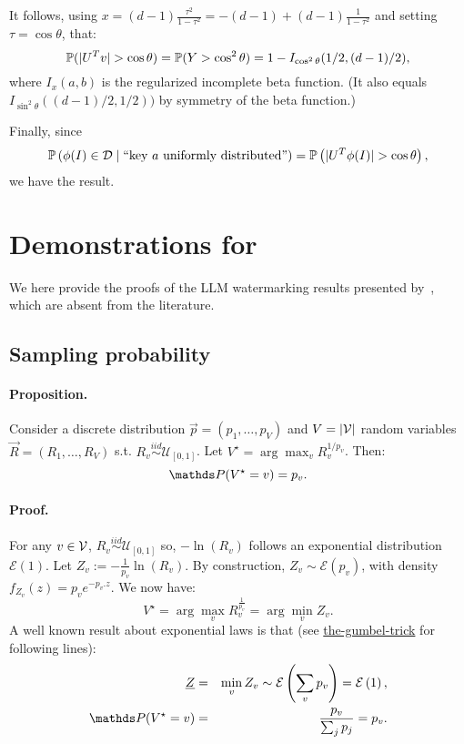 It follows, using $x=(d-1)\frac{\tau^2}{1-\tau^2} = -(d-1) + (d-1)\frac{1}{1-\tau^2}$ and setting $\tau = \cos\theta$, that:
$$\mathbb P (\lvert{U^T v}\rvert > \cos \theta) = \mathbb P (Y> \cos^2 \theta) = 1 - I_{\cos^2 \theta}(1/2, (d-1)/2),$$
where $I_x(a,b)$ is the regularized incomplete beta function.
(It also equals $ I_{\sin^2 \theta}( (d-1)/2,1/2)) $ by symmetry of the beta function.)

Finally, since 
$$\mathbb{P}\left(\phi(I)\in \mathcal D \mid \text{``key } a \text{ uniformly distributed''}\right) = \mathbb{P}\left(\lvert{U^T \phi(I)}\rvert > \cos \theta\right),$$
we have the result.





\section{Demonstrations for \texorpdfstring{\cite*{aaronson2023watermarking}}{}}\label{app/three-bricks}

We here provide the proofs of the LLM watermarking results presented by~\cite{aaronson2023watermarking}, which are absent from the literature.

\subsection{Sampling probability}
\label{chap5/app:aaronson_prob}

\paragraph*{Proposition.}
Consider a discrete distribution $\vec{p}=(p_1,\ldots,p_V)$
and $V=|\mathcal{V} |$ random variables $\vec{R} = (R_1,\ldots,R_V)$ s.t. $R_v\overset{iid}{\sim}\mathcal{U}_{[0,1]}$. 
Let $V^\star = \arg \max_v R_v^{1/p_v}$.
Then: $$\Prob(V^\star=v) = p_v.$$

\paragraph*{Proof.}
For any $v \in \mathcal{V}$, $R_v\overset{iid}{\sim}\mathcal{U}_{[0,1]}$ so, $- \ln(R_v)$ follows an exponential distribution $\mathcal{E}(1)$.
Let $Z_v := -\frac{1}{p_v} \ln(R_v)$. By construction, $Z_v\sim\mathcal{E}(p_v)$, with density $f_{Z_v}(z) = p_v e^{-p_v.z}$.
We now have:
\begin{equation}
V^\star = \arg \max_v R_v^{\frac{1}{p_v}} = \arg \min_v Z_v.
\end{equation}
A well known result about exponential laws is that (see \href{https://francisbach.com/the-gumbel-trick/}{the-gumbel-trick} for following lines):
\begin{eqnarray}
\underline{Z}  &=& \min_v Z_v \sim \mathcal{E}\left(\sum_v p_v\right)=\mathcal{E}\left(1\right),\\ \label{chap5/eq:sampling}
\Prob(V^\star=v) &=& \frac{p_v}{\sum_j p_j}  = p_v.
\end{eqnarray}

